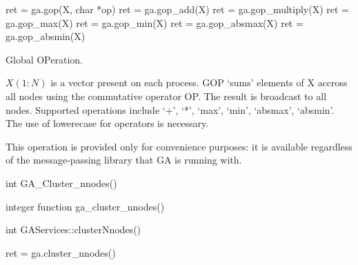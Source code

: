 \documentclass[10pt]{article}
\begin{document}
\begin{pyapi}
\begin{pycode}
ret = ga.gop(X, char *op)
ret = ga.gop_add(X)
ret = ga.gop_multiply(X)
ret = ga.gop_max(X)
ret = ga.gop_min(X)
ret = ga.gop_absmax(X)
ret = ga.gop_absmin(X)
\end{pycode}
\begin{funcargs}
\end{funcargs}
\end{pyapi}

\wcoll

\begin{desc}

Global OPeration.

$X(1:N)$ is a vector present on each process. GOP `sums' elements of X accross
all nodes using the commutative operator OP. The result is broadcast to all
nodes. Supported operations include `+', `*', `max', `min', `absmax', `absmin'.
The use of lowerecase for operators is necessary.

This operation is provided only for convenience purposes: it is available
regardless of the message-passing library that GA is running with.

\end{desc}



\begin{capi}
\begin{ccode}
int GA_Cluster_nnodes()
\end{ccode}
\end{capi}

\begin{fapi}
\begin{fcode}
integer function ga_cluster_nnodes()
\end{fcode}
\end{fapi}

\begin{cxxapi}
\begin{cxxcode}
int GAServices::clusterNnodes()
\end{cxxcode}
\end{cxxapi}

\begin{pyapi}
\begin{pycode}
ret = ga.cluster_nnodes()
\end{pycode}
\end{pyapi}
\end{document}
